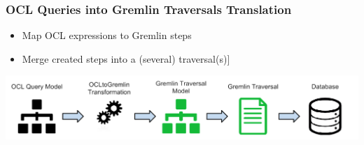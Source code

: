 \documentclass[10pt]{beamer}
\begin{document}
\begin{frame}[c]\frametitle{OCL Queries into Gremlin Traversals Translation}
	\begin{itemize}
	\item Map OCL expressions to Gremlin steps
	\item Merge created steps into a (several) traversal(s)]
	\end{itemize}
  \begin{center}
    \includegraphics[width=\textwidth]{mogwai-architecture.png}
  \end{center}	
\end{frame}
\end{document}

